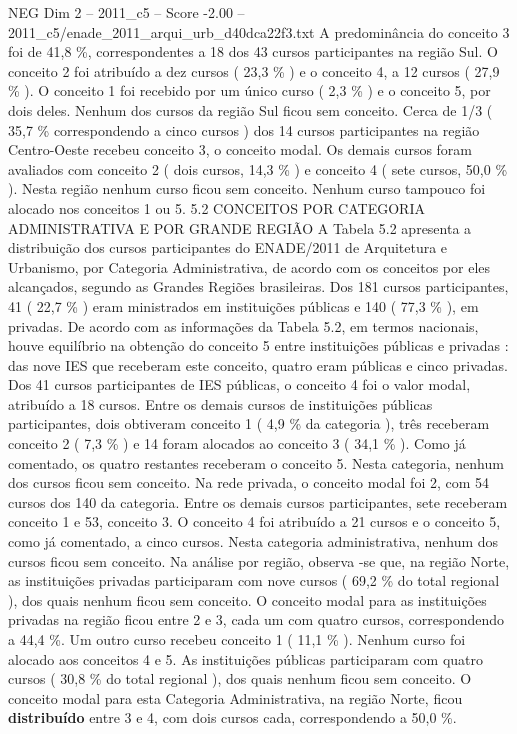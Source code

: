 \begin{textsample}{NEG Dim 2 – 2011\_c5 – Score -2.00 – 2011\_c5/enade\_2011\_arqui\_urb\_d40dca22f3.txt}
A predominância do conceito 3 foi de 41,8 \%, correspondentes a 18 dos 43 cursos participantes na região Sul.
O conceito 2 foi atribuído a dez cursos ( 23,3 \% ) e o conceito 4, a 12 cursos ( 27,9 \% ).
O conceito 1 foi recebido por um único curso ( 2,3 \% ) e o conceito 5, por dois deles.
Nenhum dos cursos da região Sul ficou sem conceito.
Cerca de 1/3 ( 35,7 \% correspondendo a cinco cursos ) dos 14 cursos participantes na região Centro-Oeste recebeu conceito 3, o conceito modal.
Os demais cursos foram avaliados com conceito 2 ( dois cursos, 14,3 \% ) e conceito 4 ( sete cursos, 50,0 \% ).
Nesta região nenhum curso ficou sem conceito.
Nenhum curso tampouco foi alocado nos conceitos 1 ou 5. 5.2 CONCEITOS POR CATEGORIA ADMINISTRATIVA E POR GRANDE REGIÃO A Tabela 5.2 apresenta a distribuição dos cursos participantes do ENADE/2011 de Arquitetura e Urbanismo, por Categoria Administrativa, de acordo com os conceitos por eles alcançados, segundo as Grandes Regiões brasileiras.
Dos 181 cursos participantes, 41 ( 22,7 \% ) eram ministrados em instituições públicas e 140 ( 77,3 \% ), em privadas.
De acordo com as informações da Tabela 5.2, em termos nacionais, houve equilíbrio na obtenção do conceito 5 entre instituições públicas e privadas : das nove IES que receberam este conceito, quatro eram públicas e cinco privadas.
Dos 41 cursos participantes de IES públicas, o conceito 4 foi o valor modal, atribuído a 18 cursos.
Entre os demais cursos de instituições públicas participantes, dois obtiveram conceito 1 ( 4,9 \% da categoria ), três receberam conceito 2 ( 7,3 \% ) e 14 foram alocados ao conceito 3 ( 34,1 \% ).
Como já comentado, os quatro restantes receberam o conceito 5.
Nesta categoria, nenhum dos cursos ficou sem conceito.
Na rede privada, o conceito modal foi 2, com 54 cursos dos 140 da categoria.
Entre os demais cursos participantes, sete receberam conceito 1 e 53, conceito 3.
O conceito 4 foi atribuído a 21 cursos e o conceito 5, como já comentado, a cinco cursos.
Nesta categoria administrativa, nenhum dos cursos ficou sem conceito.
Na análise por região, observa -se que, na região Norte, as instituições privadas participaram com nove cursos ( 69,2 \% do total regional ), dos quais nenhum ficou sem conceito.
O conceito modal para as instituições privadas na região ficou entre 2 e 3, cada um com quatro cursos, correspondendo a 44,4 \%.
Um outro curso recebeu conceito 1 ( 11,1 \% ).
Nenhum curso foi alocado aos conceitos 4 e 5.
As instituições públicas participaram com quatro cursos ( 30,8 \% do total regional ), dos quais nenhum ficou sem conceito.
O conceito modal para esta Categoria Administrativa, na região Norte, ficou \textbf{distribuído} entre 3 e 4, com dois cursos cada, correspondendo a 50,0 \%.

\end{textsample}
